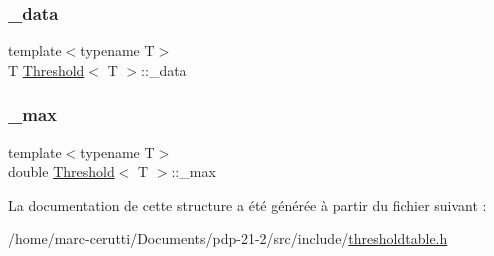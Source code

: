 \subsubsection{\texorpdfstring{\+\_\+data}{\_data}}
{\footnotesize\ttfamily template$<$typename T$>$ \\
T \hyperlink{struct_threshold}{Threshold}$<$ T $>$\+::\+\_\+data}

\mbox{\label{struct_threshold_a45ccfaf161df097939ca2014d990c41f}} 
\subsubsection{\texorpdfstring{\+\_\+max}{\_max}}
{\footnotesize\ttfamily template$<$typename T$>$ \\
double \hyperlink{struct_threshold}{Threshold}$<$ T $>$\+::\+\_\+max}



La documentation de cette structure a été générée à partir du fichier suivant \+:\begin{DoxyCompactItemize}
\item 
/home/marc-\/cerutti/\+Documents/pdp-\/21-\/2/src/include/\hyperlink{thresholdtable_8h}{thresholdtable.\+h}\end{DoxyCompactItemize}
